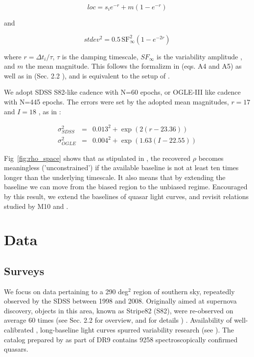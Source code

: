 \documentclass[twocolumn]{aastex62}
\begin{document}
\begin{equation}
loc = s_{i} e ^ { - r  }  + m \left( 1 - e ^{ - r }\right)
\end{equation}

and 

\begin{equation}
stdev^{2} =  0.5  \, \mathrm{SF}_{\infty}^{2} \left( 1 - e ^{  - 2 r  }  \right)
\end{equation}

where  $r = \Delta t_{i} / \tau$, $\tau$ is the damping timescale,   $SF_{\infty}$ is the  variability amplitude , and $m$ the mean magnitude.  This follows the formalizm in \cite{kelly2009} (eqs. A4 and A5) as well as in \cite{macleod2010} (Sec. 2.2 ), and is equivalent to the setup of  \cite{kozlowski2017a}. 


We adopt SDSS S82-like cadence with N=60 epochs, or OGLE-III like cadence with N=445 epochs.  The errors were set by the adopted mean magnitudes, $r=17$ and $I=18$ , as in \cite{kozlowski2017a} :

\begin{eqnarray}
\sigma_{SDSS}^{2} &=& 0.013^{2} + \exp{(2 (r-23.36))} \\
\sigma_{OGLE}^{2} &=& 0.004^{2} + \exp{(1.63 (I - 22.55))}
\end{eqnarray}



Fig~\ref{fig:rho_space} shows that as stipulated in \cite{kozlowski2017a},  the recovered $\rho$ becomes meaningless ('unconstrained') if the available baseline is not at least ten times longer than the underlying timescale. It also means that by extending the baseline we can move from the biased region to the unbiased regime.  Encouraged by this result, we extend the baselines of  quasar light curves, and revisit relations studied by  M10 and \cite{hernitschek2016}. 

\section{Data}\label{sec:data}
\subsection{Surveys}
We focus on data pertaining to a 290 deg$^{2}$ region of southern sky, repeatedly observed by the SDSS between 1998 and 2008. Originally aimed at supernova discovery, objects in this area, known as Stripe82 (S82), were  re-observed on average 60 times (see \citealt{macleod2012} Sec. 2.2 for overview, and \citealt{annis2014} for details ) . Availability of well-calibrated \citep{ivezic2007}, long-baseline light curves spurred variability research (see \citealt{sesar2007}). The catalog prepared by \citep{schneider2008} as part of DR9  contains 9258 spectroscopically confirmed quasars.  
\end{document}
